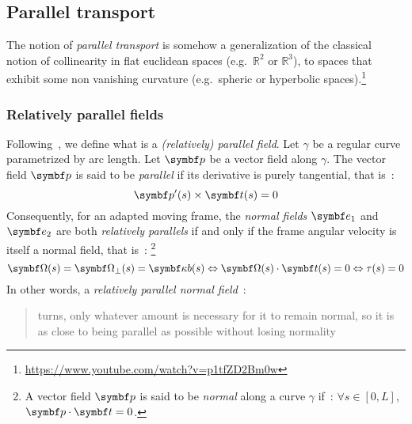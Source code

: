 \subsection{Parallel transport}\label{sec=paralleltransport}
The notion of \emph{parallel transport} is somehow a generalization of the classical notion of collinearity in flat euclidean spaces (e.g.\ $\mathbb{R}^2$ or $\mathbb{R}^3$), to spaces that exhibit some non vanishing curvature (e.g.\ spheric or hyperbolic spaces).\footnote{\url{https://www.youtube.com/watch?v=p1tfZD2Bm0w}}

\subsubsection{Relatively parallel fields}
Following~, we define what is a \emph{(relatively) parallel field}. Let $\gamma$ be a regular curve parametrized by arc length. Let $\vect{p}$ be a vector field along $\gamma$. The vector field $\vect{p}$ is said to be \emph{parallel} if its derivative is purely tangential, that is~:
\begin{equation}
	\vect{p}'(s) \times \vect{t}(s) = 0
\end{equation}
Consequently, for an adapted moving frame, the \emph{normal fields} $\vect{e}_1$ and $\vect{e}_2$ are both \emph{relatively parallels} if and only if the frame angular velocity is itself a normal field, that is~: \footnote{A vector field $\vect{p}$ is said to be \emph{normal} along a curve $\gamma$ if~: $\forall s \in [0,L]$, $\vect{p}\cdot\vect{t} = 0$.}
\begin{equation}
	\vect{\Omega}(s) = \vect{\Omega}_{\perp}(s) =  \vect{\kappa b}(s) \Leftrightarrow \vect{\Omega}(s) \cdot \vect{t}(s) = 0  \Leftrightarrow \tau(s) = 0  
\end{equation}
In other words, a \emph{relatively parallel normal field}~: \blockcquote{Bishop1975}{turns, only whatever amount is necessary for it to remain normal, so it is as close to being parallel as possible without losing normality}. 
%

